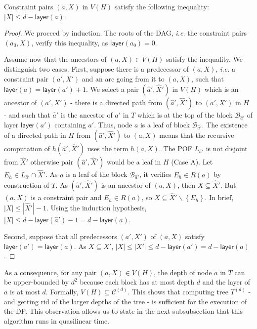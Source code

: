 \documentclass[a4paper,UKenglish,numberwithinsect,cleveref, autoref]{lipics-v2021}
\newcommand{\set}[1]{\left\{ #1 \right\}}
\newcommand{\card}[1]{\left| #1 \right|}
\begin{document}
\begin{lemma}
Constraint pairs $(a,X)$ in $V(H)$ satisfy the following inequality: $\card{X}\le d-\textsf{layer}(a)$.
\label{le:layer_inequality}
\end{lemma}
\begin{proof}
We proceed by induction. The roots of the DAG, {\em i.e.} the constraint pairs $(a_0,X)$, verify this inequality, as $\textsf{layer}(a_0) = 0$. 

Assume now that the ancestors of $(a,X) \in V(H)$ satisfy the inequality. We distinguish two cases. First, suppose there is a predecessor of $(a,X)$, {\em i.e.} a constraint pair $(a',X')$ and an arc going from it to $(a,X)$, such that $\textsf{layer}(a) = \textsf{layer}(a')+1$. We select a pair $(\widehat{a}',\widehat{X}')$ in $V(H)$ which is an ancestor of $(a',X')$ - there is a directed path from  $(\widehat{a}',\widehat{X}')$ to $(a',X')$ in $H$ - and such that $\widehat{a}'$ is the ancestor of $a'$ in $T$ which is at the top of the block $\mathcal{B}_{\widehat{a}'}$ of layer $\textsf{layer}(a')$ containing $a'$. Thus, node $a$ is a leaf of block $\mathcal{B}_{\widehat{a}'}$. The existence of a directed path in $H$ from $(\widehat{a}',\widehat{X}')$ to $(a,X)$ means that the recursive computation of $h(\widehat{a}',\widehat{X}')$ uses the term $h(a,X)$. The POF $L_{\widehat{a}'}$ is not disjoint from $\widehat{X}'$ otherwise pair $(\widehat{a}',\widehat{X}')$ would be a leaf in $H$ (Case A). Let $E_h \in L_{\widehat{a}'} \cap \widehat{X}'$. As $a$ is a leaf of the block $\mathcal{B}_{\widehat{a}'}$, it verifies $E_h \in R(a)$ by construction of $T$. As $(\widehat{a}',\widehat{X}')$ is an ancestor of $(a,X)$, then $X \subseteq \widehat{X}'$. But $(a,X)$ is a constraint pair and $E_h \in R(a)$, so $X \subseteq \widehat{X}'\backslash \set{E_h}$. In brief, $\card{X} \le \card{\widehat{X}'} - 1$. Using the induction hypothesis, $\card{X} \le d-\textsf{layer}(\widehat{a}')-1 = d-\textsf{layer}(a)$.

Second, suppose that all predecessors $(a',X')$ of $(a,X)$ satisfy $\textsf{layer}(a') = \textsf{layer}(a)$. As $X \subseteq X'$, $\card{X}\le \card{X'} \le d-\textsf{layer}(a') = d-\textsf{layer}(a)$. 
\end{proof}

As a consequence, for any pair $(a,X) \in V(H)$, the depth of node $a$ in $T$ can be upper-bounded by $d^2$ because each block has at most depth $d$ and the layer of $a$ is at most $d$. Formally, $V(H) \subseteq \mathcal{C}^{(d)}$. This shows that computing tree $T^{(d)}$ - and getting rid of the larger depths of the tree - is sufficient for the execution of the DP. This observation allows us to state in the next subsubsection that this algorithm runs in quasilinear time.
\end{document}
